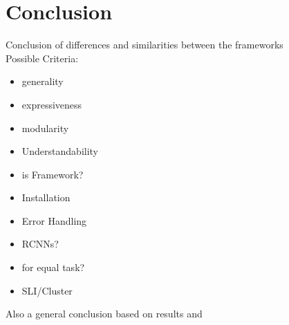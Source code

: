 \chapter{Conclusion}

Conclusion of differences and similarities between the frameworks\\

Possible Criteria: %
\begin{itemize}
	\item generality
	\item expressiveness
	\item modularity
	\item Understandability
	\item is Framework?
	\item Installation 
	\item Error Handling
	\item RCNNs?
	\item for equal task?
	\item SLI/Cluster
\end{itemize}
Also a general conclusion based on results and \cite{grzywaczewski2017training}